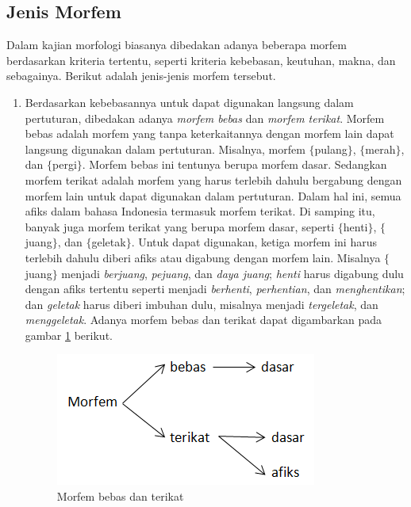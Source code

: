 \subsection{Jenis Morfem}
\label{sec:jenisMorfem}

Dalam kajian morfologi biasanya dibedakan adanya beberapa morfem berdasarkan kriteria tertentu, seperti kriteria kebebasan, keutuhan, makna, dan sebagainya. Berikut adalah jenis-jenis morfem tersebut.

\begin{enumerate}
	\item Berdasarkan kebebasannya untuk dapat digunakan langsung dalam pertuturan, dibedakan adanya \textit{morfem bebas} dan \textit{morfem terikat}. Morfem bebas adalah morfem yang tanpa keterkaitannya dengan morfem lain dapat langsung digunakan dalam pertuturan. Misalnya, morfem $\lbrace$pulang$\rbrace$, $\lbrace$merah$\rbrace$, dan $\lbrace$pergi$\rbrace$. Morfem bebas ini tentunya berupa morfem dasar. Sedangkan morfem terikat adalah morfem yang harus terlebih dahulu bergabung dengan morfem lain untuk dapat digunakan dalam pertuturan. Dalam hal ini, semua afiks dalam bahasa Indonesia termasuk morfem terikat. Di samping itu, banyak juga morfem terikat yang berupa morfem dasar, seperti $\lbrace$henti$\rbrace$, $\lbrace$juang$\rbrace$, dan $\lbrace$geletak$\rbrace$. Untuk dapat digunakan, ketiga morfem ini harus terlebih dahulu diberi afiks atau digabung dengan morfem lain. Misalnya $\lbrace$juang$\rbrace$ menjadi \textit{berjuang}, \textit{pejuang}, dan \textit{daya juang}; \textit{henti} harus digabung dulu dengan afiks tertentu seperti menjadi \textit{berhenti}, \textit{perhentian}, dan \textit{menghentikan}; dan \textit{geletak} harus diberi imbuhan dulu, misalnya menjadi \textit{tergeletak}, dan \textit{menggeletak}. Adanya morfem bebas dan terikat dapat digambarkan pada gambar \ref{gambar-morfem-bebas-terikat} berikut.
	
	\begin{figure}[H]
	\centering
	\includegraphics[scale=1]{Gambar/gambar-morfem-bebas-terikat}
	\caption[Morfem bebas dan terikat]{Morfem bebas dan terikat\cite{chaer:08:morfologi}} 
	\label{gambar-morfem-bebas-terikat}
	\end{figure}
	

\end{enumerate}
